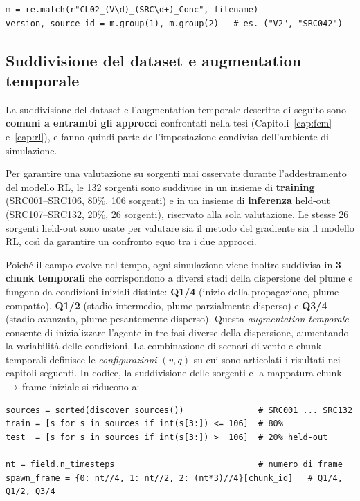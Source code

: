 \begin{lstlisting}
m = re.match(r"CL02_(V\d)_(SRC\d+)_Conc", filename)
version, source_id = m.group(1), m.group(2)   # es. ("V2", "SRC042")
\end{lstlisting}

\subsection{Suddivisione del dataset e augmentation temporale}
\label{sec:split}

La suddivisione del dataset e l'augmentation temporale descritte di seguito sono
\textbf{comuni a entrambi gli approcci} confrontati nella tesi (Capitoli~\ref{cap:fcm}
e~\ref{cap:rl}), e fanno quindi parte dell'impostazione condivisa dell'ambiente di
simulazione.

Per garantire una valutazione su sorgenti mai osservate durante l'addestramento del
modello RL, le 132 sorgenti sono suddivise in un insieme di \textbf{training}
(SRC001--SRC106, 80\%, 106 sorgenti) e in un insieme di \textbf{inferenza} held-out
(SRC107--SRC132, 20\%, 26 sorgenti), riservato alla sola valutazione. Le stesse 26
sorgenti held-out sono usate per valutare sia il metodo del gradiente sia il modello RL,
cos\`i da garantire un confronto equo tra i due approcci.

Poich\'e il campo evolve nel tempo, ogni simulazione viene inoltre suddivisa in
\textbf{3 chunk temporali} che corrispondono a diversi stadi della dispersione del plume
e fungono da condizioni iniziali distinte: \textbf{Q1/4} (inizio della propagazione,
plume compatto), \textbf{Q1/2} (stadio intermedio, plume parzialmente disperso) e
\textbf{Q3/4} (stadio avanzato, plume pesantemente disperso). Questa
\emph{augmentation temporale} consente di inizializzare l'agente in tre fasi diverse della
dispersione, aumentando la variabilit\`a delle condizioni. La combinazione di scenari di
vento e chunk temporali definisce le \emph{configurazioni} $(v, q)$ su cui sono
articolati i risultati nei capitoli seguenti. In codice, la suddivisione delle sorgenti e
la mappatura chunk\,$\to$\,frame iniziale si riducono a:

\begin{lstlisting}
sources = sorted(discover_sources())               # SRC001 ... SRC132
train = [s for s in sources if int(s[3:]) <= 106]  # 80%
test  = [s for s in sources if int(s[3:]) >  106]  # 20% held-out

nt = field.n_timesteps                             # numero di frame
spawn_frame = {0: nt//4, 1: nt//2, 2: (nt*3)//4}[chunk_id]   # Q1/4, Q1/2, Q3/4
\end{lstlisting}

